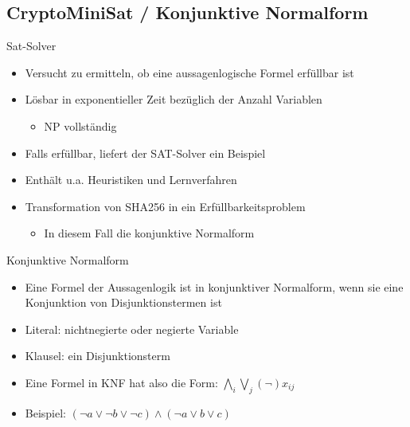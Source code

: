 \documentclass{beamer}
\begin{document}
  \subsection{CryptoMiniSat / Konjunktive Normalform}
    \begin{frame}{Sat-Solver}
      \begin{itemize}
        \setlength{\itemsep}{20pt}
        \item Versucht zu ermitteln, ob eine aussagenlogische Formel erfüllbar ist
        \item Lösbar in exponentieller Zeit bezüglich der Anzahl Variablen
        \begin{itemize}
          \item NP vollständig
        \end{itemize}
        \item Falls erfüllbar, liefert der SAT-Solver ein Beispiel
        \item Enthält u.a. Heuristiken und Lernverfahren
        \item Transformation von SHA256 in ein Erfüllbarkeitsproblem
        \begin{itemize}
         \item In diesem Fall die konjunktive Normalform
        \end{itemize}
      \end{itemize}
    \end{frame}
    \begin{frame}{Konjunktive Normalform}
      \begin{itemize}
        \setlength{\itemsep}{16pt}
        \item Eine Formel der Aussagenlogik ist in konjunktiver Normalform, wenn sie eine Konjunktion von Disjunktionstermen ist
        \item Literal: nichtnegierte oder negierte Variable
        \item Klausel: ein Disjunktionsterm
        \item Eine Formel in KNF hat also die Form: \newline \newline $ \bigwedge\limits_{i} \bigvee\limits_{j} (\neg)x_{ij} $
        \item Beispiel: $ (\neg a \vee \neg b \vee \neg c) \wedge (\neg a \vee b \vee c) $
      \end{itemize}
    \end{frame}
\end{document}

